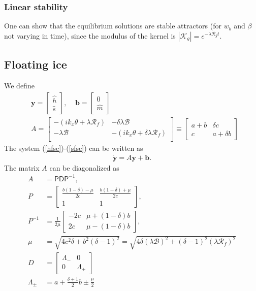 \documentclass[paper=a4, fontsize=11pt]{article}
\begin{document}
\subsubsection*{Linear stability}
One can show that the equilibrium solutions are stable attractors
(for $w_b$ and $\beta$ not varying in time), since the modulus of the kernel is
$|\mathcal{K}_g| = e^{-\lambda \mathcal{R}_gt}$.


\subsection*{Floating ice}
We define
\begin{align}
&\pmb{y} = \begin{bmatrix}
\widehat{h} \\
\widehat{s}
\end{bmatrix}, \;\;\;\;
\pmb{b} =
\begin{bmatrix}
0\\
\widehat{m}
\end{bmatrix}\\
&{A} = \begin{bmatrix}
-(ik_x \theta  + \lambda \mathcal{R}_f) & -\delta\lambda\mathcal{B} \\
-\lambda\mathcal{B} & -(ik_x \theta  + \delta\lambda\mathcal{R}_f) \\
\end{bmatrix} \equiv
\begin{bmatrix}
a+b & \delta c \\
c & a+\delta b
\end{bmatrix}
\label{Amat}
\end{align}
The system (\ref{hfsc})-(\ref{sfsc}) can be written as
\begin{align}
\dot{\pmb{y}} = {A}\pmb{y} + \pmb{b}.
\end{align}
The matrix ${A}$ can be diagonalized as
\begin{align}
{A} &= \mathsf{P}\mathsf{D}\mathsf{P}^{-1},\\
{P} &= \begin{bmatrix}
\frac{b(1-\delta)-\mu}{2c} & \frac{b(1-\delta)+\mu}{2c} \\
1 & 1
\end{bmatrix},\\
{P}^{-1} &= \frac{1}{2\mu}\begin{bmatrix}
-2c &  \mu+(1-\delta)b \\
2c &  \mu-(1-\delta)b
\end{bmatrix},\\
\mu &= \sqrt{4c^2 \delta + b^2(\delta-1)^2} = \sqrt{4\delta(\lambda\mathcal{B})^2 + (\delta-1)^2(\lambda\mathcal{R}_f)^2 } \label{mu}\\
{D} &= \begin{bmatrix}
\Lambda_-  & 0 \\
0 & \Lambda_+
\end{bmatrix} \\
\Lambda_\pm &= a+\frac{\delta+1}{2}b \pm \frac{\mu}{2} \label{Lambda}
\end{align}
\end{document}
